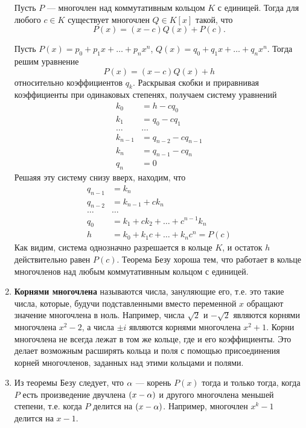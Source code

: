 \begin{enumerate}
\begin{thrm}[Без\'y]
Пусть $P$ --- многочлен над коммутативным кольцом $K$ с единицей. Тогда для любого $c\in K$ существует многочлен $Q\in K[x]$ такой, что
$$
P(x) = (x-c)Q(x) + P(c).
$$
\end{thrm}
\pf
Пусть $P(x)=p_0+p_1x+\dots+p_nx^n$, $Q(x)=q_0+q_1x+\dots+q_nx^n$. Тогда решим уравнение
$$
P(x) = (x-c)Q(x) + h
$$
относительно коэффициентов $q_k$. Раскрывая скобки и приравнивая коэффициенты при одинаковых степенях, получаем систему уравнений
\begin{align*}
k_0 & = h-cq_0 \\
k_1 & = q_0-cq_1 \\
\dots & \dots \\
k_{n-1} & = q_{n-2}-cq_{n-1} \\
k_n & = q_{n-1}-cq_n \\
q_n & =  0
\end{align*}
Решаяя эту систему снизу вверх, находим, что
\begin{align*}
q_{n-1} & = k_n \\
q_{n-2} & = k_{n-1} + c k_n \\
\dots & \dots \\
q_0 & = k_1+ck_2+\dots +c^{n-1}k_n \\
h & =  k_0 + k_1c+\dots +k_nc^n = P(c)
\end{align*}
Как видим, система однозначно разрешается в кольце $K$, и остаток $h$ действительно равен $P(c)$.
\epf
Теорема Безу хороша тем, что работает в кольце многочленов над любым коммутативнным кольцом с единицей.

\item \textbf{Корнями многочлена} называются числа, зануляющие его, т.е. это такие числа, которые, будучи подставленными вместо переменной $x$ обращают значение многочлена в ноль. Например, числа $\sqrt 2$ и $-\sqrt 2$ являются корнями многочлена $x^2-2$, а числа $\pm i$ являются корнями многочлена $x^2+1$. Корни многочлена не всегда лежат в том же кольце, где и его коэффициенты. Это делает возможным расширять кольца и поля с помощью присоединения корней многочленов, заданных над этими кольцами и полями.
\item Из теоремы Безу следует, что $\alpha$ --- корень $P(x)$ тогда и только тогда, когда $P$ есть произведение двучлена $(x-\alpha)$ и другого многочлена меньшей степени, т.е. когда $P$ делится на $(x-\alpha)$. Например, многочлен $x^k-1$ делится на $x-1$.


\end{enumerate}
